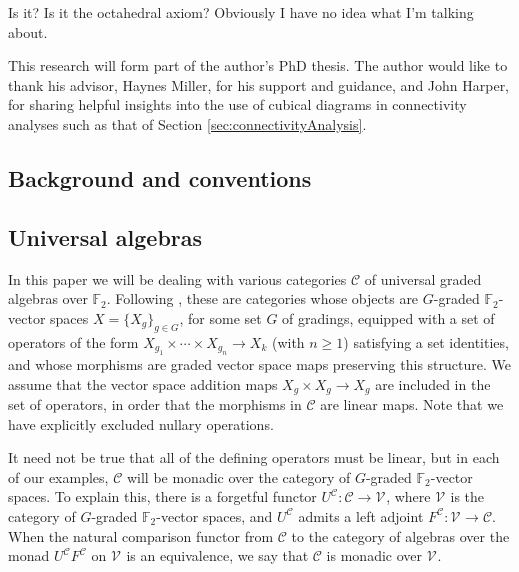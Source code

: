 \documentclass[11pt]{amsart}
\theoremstyle{plain}
\theoremstyle{definition}
\renewcommand{\to}{\longrightarrow}
\newcommand{\calV}{\mathcal{V}}
\newcommand{\calc}{\mathcal{C}}
\theoremstyle{plain}
\newcommand{\vect}[2]{\calV^{#1}_{#2}}
\newcommand{\F}{\mathbb{F}}
\newcommand{\Ftwo}{\F_2}
\begin{document}
Is it? Is it the octahedral axiom? Obviously I have no idea what I'm talking about.






\begin{Intro}
This research will form part of the author's PhD thesis. The author would like to thank his advisor, Haynes Miller, for his support and guidance, and John Harper, for sharing helpful insights into the use of cubical diagrams in connectivity analyses such as that of Section \ref{sec:connectivityAnalysis}.
\end{Intro}

\begin{Conventions and notation}
\section{\textbf{Background and conventions}}

\subsection{Universal algebras}\label{Universal algebras}
In this paper we will be dealing with various categories $\calc$ of universal graded algebras over $\Ftwo $. Following \cite[\S2.1]{Blanc_Stover-Groth_SS.pdf}, these are categories whose objects are $G$-graded $\Ftwo $-vector spaces $X=\{X_g\}_{g\in G}$, for some set $G$ of gradings, equipped with a set of operators of the form $X_{g_1}\times \cdots \times X_{g_n}\to X_k$ (with $n\geq1$)  satisfying a set identities, and whose morphisms are graded vector space maps preserving this structure. We assume that the vector space addition  maps $X_g\times X_g\to X_{g}$ are included in the set of operators, in order that the morphisms in $\calc$ are linear maps. Note that we have explicitly excluded nullary operations. 

It need not  be true that all of the defining operators must be linear, but in each of our examples, $\calc$ will be monadic over the category of $G$-graded $\Ftwo $-vector spaces. To explain this, there is a forgetful functor $U^\calc:\calc\to\vect{}{}$, where $\vect{}{}$ is the category of $G$-graded $\Ftwo $-vector spaces, and $U^{\calc}$ admits a left adjoint  $F^\calc:\vect{}{}\to\calc$. %
When the natural comparison functor from $\calc$ to the category of algebras over the monad $U^{\calc}F^{\calc}$ on $\vect{}{}$ is an equivalence, we say that $\calc$ is monadic over $\vect{}{}$.


\end{Conventions and notation}
\end{document}
